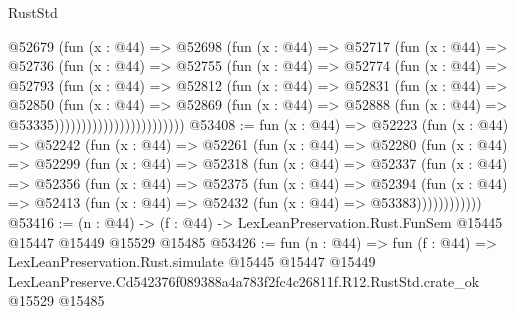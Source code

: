 \begin{lexlean}{RustStd}
\begin{coremodule}
                          @52679
                            (fun (x : @44) =>
                            @52698
                              (fun (x : @44) =>
                              @52717
                                (fun (x : @44) =>
                                @52736
                                  (fun (x : @44) =>
                                  @52755
                                    (fun (x : @44) =>
                                    @52774
                                      (fun (x : @44) =>
                                      @52793
                                        (fun (x : @44) =>
                                        @52812
                                          (fun (x : @44) =>
                                          @52831
                                            (fun (x : @44) =>
                                            @52850
                                              (fun (x : @44) =>
                                              @52869
                                                (fun (x : @44) =>
                                                @52888
                                                  (fun (x : @44) => @53335))))))))))))))))))))))))
@53408 := fun (x : @44) =>
  @52223
    (fun (x : @44) =>
    @52242
      (fun (x : @44) =>
      @52261
        (fun (x : @44) =>
        @52280
          (fun (x : @44) =>
          @52299
            (fun (x : @44) =>
            @52318
              (fun (x : @44) =>
              @52337
                (fun (x : @44) =>
                @52356
                  (fun (x : @44) =>
                  @52375
                    (fun (x : @44) =>
                    @52394
                      (fun (x : @44) =>
                      @52413 (fun (x : @44) => @52432 (fun (x : @44) => @53383))))))))))))
@53416 := (n : @44) ->
  (f : @44) -> LexLeanPreservation.Rust.FunSem @15445 @15447 @15449 @15529 @15485
@53426 := fun (n : @44) =>
  fun (f : @44) =>
  LexLeanPreservation.Rust.simulate
    @15445
    @15447
    @15449
    LexLeanPreserve.Cd542376f089388a4a783f2fc4c26811f.R12.RustStd.crate_ok
    @15529
    @15485
\end{coremodule}
\end{lexlean}
